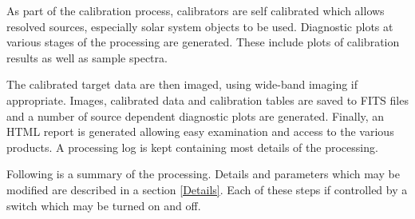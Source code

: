 \documentclass[11pt]{article}
\begin{document}
As part of the calibration process, calibrators are self calibrated
which allows resolved sources, especially solar system objects to be
used. 
Diagnostic plots at various stages of the processing are generated.
These  include plots of calibration results as well as sample spectra.

The calibrated target data are then imaged, using wide-band imaging if
appropriate. 
Images, calibrated data and calibration tables are saved to FITS files
and a number of source dependent diagnostic plots are generated.
Finally, an HTML report is generated allowing easy examination and
access to the various products.
A processing log is kept containing most details of the processing.

Following is a summary of the processing.
Details and parameters which may be modified are described in a
section \ref{Details}.
Each of these steps if controlled by a switch which may be turned on and off.
\end{document}
